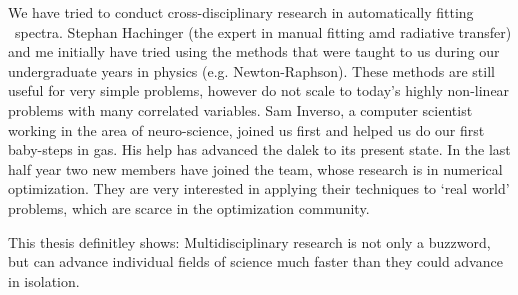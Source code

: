 We have tried to conduct cross-disciplinary research in automatically fitting \sneia\ spectra. Stephan Hachinger (the expert in manual fitting amd radiative transfer) and me initially have tried using the methods that were taught to us during our undergraduate years in physics (e.g. Newton-Raphson). These methods are still useful for very simple problems, however do not scale to today's highly non-linear problems with many correlated variables. Sam Inverso, a computer scientist working in the area of neuro-science, joined us first and helped us do our first baby-steps in \glspl{ga}. His help has advanced the \gls{dalek} to its present state. In the last half year two new members have joined the team, whose research is in numerical optimization. They are very interested in applying their techniques to `real world' problems, which are scarce in the optimization community.

This thesis definitley shows: Multidisciplinary research is not only a buzzword, but can advance individual fields of science much faster than they could advance in isolation.


